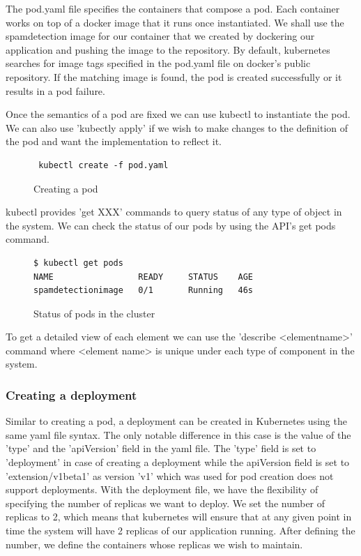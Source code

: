 \documentclass[9pt,twocolumn,twoside]{../../styles/osajnl}
\begin{document}
{\noindent
The pod.yaml file specifies the containers that compose a pod. Each
container works on top of a docker image that it runs once
instantiated. We shall use the spamdetection image for our container
that we created by dockering our application and pushing the image to
the repository. By default, kubernetes searches for image tags
specified in the pod.yaml file on docker's public repository. If the
matching image is found, the pod is created successfully or it results
in a pod failure.

\noindent
Once the semantics of a pod are fixed we can use kubectl to
instantiate the pod. We can also use 'kubectly apply' if we wish to
make changes to the definition of the pod and want the implementation
to reflect it.


\begin{figure}
\begin{verbatim}
 kubectl create -f pod.yaml
\end{verbatim}
\caption{Creating a pod}
\label{Creating a pod}
\end{figure}

\noindent
kubectl provides 'get XXX' commands to query status of any type of
object in the system. We can check the status of our pods by using the
API's get pods command.

\begin{figure}
\begin{verbatim}
$ kubectl get pods
NAME                 READY     STATUS    AGE
spamdetectionimage   0/1       Running   46s
\end{verbatim}
\caption{Status of pods in the cluster}
\label{Status of pods in the cluster}
\end{figure}
\noindent
To get a detailed view of each element we can use the 'describe
<element\textunderscore name>' command where <element\textunderscore
name> is unique under each type of component in the system.


\subsubsection{Creating a deployment}
Similar to creating a pod, a deployment can be created in Kubernetes
using the same yaml file syntax. The only notable difference in this
case is the value of the 'type' and the 'apiVersion' field in the yaml
file. The 'type' field is set to 'deployment' in case of creating a
deployment while the apiVersion field is set to 'extension/v1beta1' as
version 'v1' which was used for pod creation does not support
deployments.  With the deployment file, we have the flexibility of
specifying the number of replicas we want to deploy. We set the number
of replicas to 2, which means that kubernetes will ensure that at any
given point in time the system will have 2 replicas of our application
running. After defining the number, we define the containers whose
replicas we wish to maintain.

}
\end{document}
